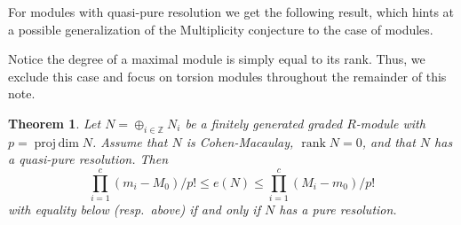 \documentclass[12pt,twoside]{amsart}
\numberwithin{equation}{section}
\newcommand{\Z}{\mathbb{Z}}
\DeclareMathOperator{\projdim}{proj\,dim}
\DeclareMathOperator{\rank}{rank}
\DeclareMathOperator{\dirsum}{\oplus}
\newtheorem{theorem}{Theorem}[section]
\theoremstyle{definition}
\begin{document}
For modules with quasi-pure resolution we get the following result, which hints at a
possible generalization of the Multiplicity conjecture to the case of modules.

Notice the degree of a maximal module is simply equal to its rank. Thus, we exclude this
case and focus on torsion modules throughout the remainder of this note.

\begin{theorem}
\label{modulequasi} Let $N=\dirsum_{i\in\Z}N_i$ be a finitely generated graded $R$-module
with $p=\projdim N$. Assume that $N$ is Cohen-Macaulay, $\rank N=0$, and that $N$ has a
quasi-pure resolution. Then
$$
\prod_{i=1}^c (m_i-M_0) / p! \leq e(N) \leq \prod_{i=1}^c (M_i - m_0)/p!
$$
with equality below (resp.\ above) if and only if $N$ has a pure resolution.
\end{theorem}
\end{document}

